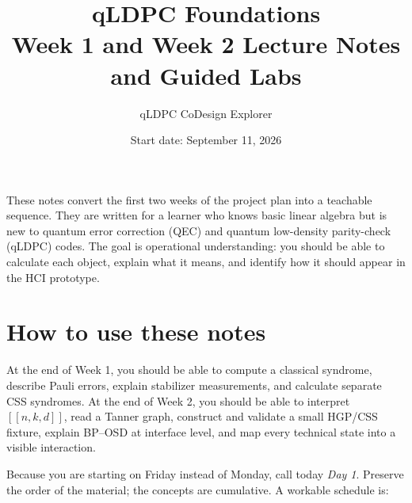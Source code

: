 \documentclass[11pt]{article}
\title{\vspace{-1.8cm}\textbf{qLDPC Foundations}\\[3pt]
\Large Week 1 and Week 2 Lecture Notes and Guided Labs}
\author{qLDPC CoDesign Explorer}
\date{Start date: September 11, 2026}
\begin{document}
\maketitle

\begin{center}
\begin{minipage}{0.92\textwidth}
\small
These notes convert the first two weeks of the project plan into a teachable sequence. They are
written for a learner who knows basic linear algebra but is new to quantum error correction (QEC)
and quantum low-density parity-check (qLDPC) codes. The goal is operational understanding: you
should be able to calculate each object, explain what it means, and identify how it should appear in
the HCI prototype.
\end{minipage}
\end{center}

\tableofcontents
\newpage

\section{How to use these notes}

\begin{learningbox}
At the end of Week 1, you should be able to compute a classical syndrome, describe Pauli errors,
explain stabilizer measurements, and calculate separate CSS syndromes. At the end of Week 2, you
should be able to interpret \([[n,k,d]]\), read a Tanner graph, construct and validate a small HGP/CSS
fixture, explain BP--OSD at interface level, and map every technical state into a visible interaction.
\end{learningbox}

Because you are starting on Friday instead of Monday, call today \emph{Day 1}. Preserve the order of
the material; the concepts are cumulative. A workable schedule is:
\end{document}
